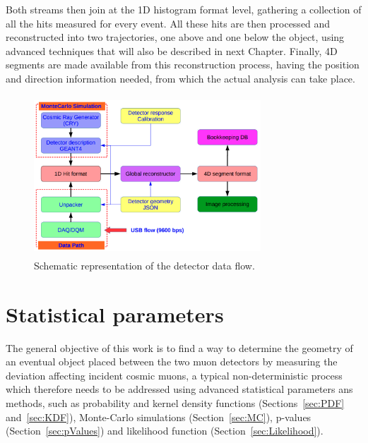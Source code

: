 \documentclass[a4paper, 11pt]{report}
\begin{document}
Both streams then join at the 1D histogram format level, gathering a collection of all the hits measured for every event. All these hits are then processed and reconstructed into two trajectories, one above and one below the object, using advanced techniques that will also be described in next Chapter. Finally, 4D segments are made available from this reconstruction process, having the position and direction information needed, from which the actual analysis can take place.

\begin{figure}[htbp]
\begin{center}
\includegraphics[width=8.5cm, height=6cm]{figs/dataFlow.png}
\caption{Schematic representation of the detector data flow.}
\label{fig:dataFlow}
\end{center}
\end{figure}



























\chapter{Statistical parameters}

The general objective of this work is to find a way to determine the geometry of an eventual object placed between the two muon detectors by measuring the deviation affecting incident cosmic muons, a typical non-deterministic process which therefore needs to be addressed using advanced statistical parameters ans methods, such as probability and kernel density functions (Sections~\ref{sec:PDF} and~\ref{sec:KDF}), Monte-Carlo simulations (Section~\ref{sec:MC}), p-values (Section~\ref{sec:pValues}) and likelihood function (Section~\ref{sec:Likelihood}).
\end{document}
